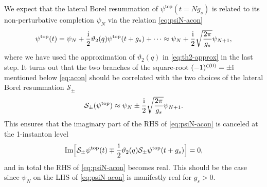 \documentclass[11pt]{article}
\newcommand{\ri}{{\rm i}}
\def\rt#1{\sqrt{#1}}
\renewcommand{\[}{\begin{eqnarray}}
\renewcommand{\]}{\end{eqnarray}}
\begin{document}
We expect that the lateral Borel resummation of $\psi^{\text{top}}(t=Ng_s)$
is related to its non-perturbative completion $\psi_N$ 
via the relation \eqref{eq:psiN-acon} 
\begin{equation}
\begin{aligned}
 \psi^{\text{top}}(t)=\psi_N+\frac{\ri}{2}\vartheta_2(q)\psi^{\text{top}}(t+g_s)+\cdots
\approx \psi_N+\frac{\ri}{2}\rt{\frac{2\pi}{g_s}}\psi_{N+1},
\end{aligned} 
\end{equation}
where we have used the approximation of
$\vartheta_2(q)$ in \eqref{eq:th2-approx}
in the last step.
It turns out that the two branches of the square-root $(-1)^{\zeta(0)}=\pm\ri$
mentioned below \eqref{eq:acon} should be correlated with the two
choices of the lateral Borel resummation $\mathcal{S}_\pm$
\begin{align}
 \mathcal{S}_{\pm}(\psi^{\text{top}})\approx \psi_N\pm\frac{\ri}{2}\rt{\frac{2\pi}{g_s}}\psi_{N+1}.
\label{eq:BPtop}
\end{align}
This ensures that 
the imaginary part of the RHS of \eqref{eq:psiN-acon} 
is canceled at the 1-instanton level
\begin{equation}
\begin{aligned}
 \textrm{Im}\Bigl[\mathcal{S}_{\pm}\psi^{\text{top}}(t)\mp\frac{\ri}{2}\vartheta_2(q)
\mathcal{S}_{\pm}\psi^{\text{top}}(t+g_s)\Bigr]=0,
\end{aligned} 
\end{equation}
and  in total the RHS of \eqref{eq:psiN-acon} becomes real. 
This should be the case 
since $\psi_N$ on the LHS of \eqref{eq:psiN-acon}
is manifestly real for $g_s>0$.
\end{document}
